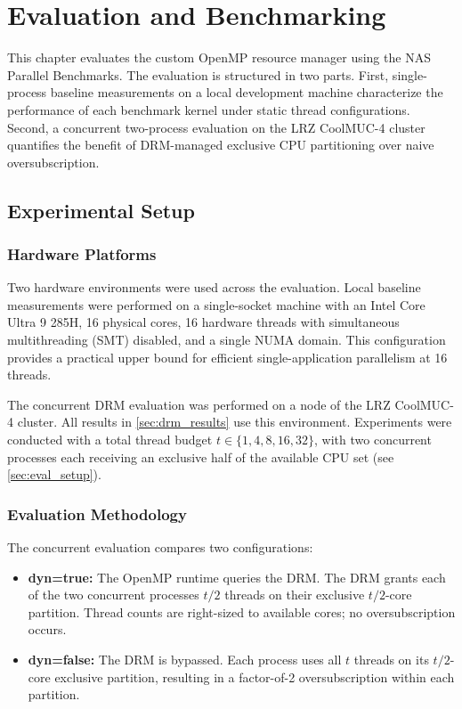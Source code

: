 
\chapter{Evaluation and Benchmarking}\label{chapter:benchmarks}

This chapter evaluates the custom OpenMP resource manager using the NAS Parallel Benchmarks. The evaluation is structured in two parts. First, single-process baseline measurements on a local development machine characterize the performance of each benchmark kernel under static thread configurations. Second, a concurrent two-process evaluation on the LRZ CoolMUC-4 cluster quantifies the benefit of DRM-managed exclusive CPU partitioning over naive oversubscription.

\section{Experimental Setup}

\subsection{Hardware Platforms}

Two hardware environments were used across the evaluation. Local baseline measurements were performed on a single-socket machine with an Intel Core Ultra 9 285H, 16 physical cores, 16 hardware threads with simultaneous multithreading (SMT) disabled, and a single NUMA domain. This configuration provides a practical upper bound for efficient single-application parallelism at 16 threads.

The concurrent DRM evaluation was performed on a node of the LRZ CoolMUC-4 cluster. All results in \autoref{sec:drm_results} use this environment. Experiments were conducted with a total thread budget $t \in \{1, 4, 8, 16, 32\}$, with two concurrent processes each receiving an exclusive half of the available CPU set (see \autoref{sec:eval_setup}).

\subsection{Evaluation Methodology}\label{sec:eval_setup}

The concurrent evaluation compares two configurations:

\begin{itemize}
  \item \textbf{dyn=true:} The OpenMP runtime queries the DRM\@. The DRM grants each of the two concurrent processes $t/2$ threads on their exclusive $t/2$-core partition. Thread counts are right-sized to available cores; no oversubscription occurs.
  \item \textbf{dyn=false:} The DRM is bypassed. Each process uses all $t$ threads on its $t/2$-core exclusive partition, resulting in a factor-of-2 oversubscription within each partition.
\end{itemize}

